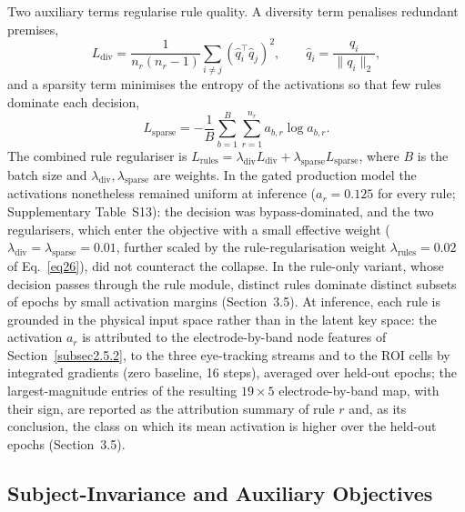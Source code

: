\documentclass[pdflatex,sn-basic,Numbered]{sn-jnl}
\begin{document}
Two auxiliary terms regularise rule quality. A diversity term penalises redundant premises,
\begin{equation}
L_{\mathrm{div}} = \frac{1}{n_r(n_r-1)} \sum_{i\neq j} \left(\hat q_i^\top \hat q_j\right)^2, \qquad \hat q_i = \frac{q_i}{\|q_i\|_2}, \label{eq19}
\end{equation}
and a sparsity term minimises the entropy of the activations so that few rules dominate each decision,
\begin{equation}
L_{\mathrm{sparse}} = -\frac{1}{B}\sum_{b=1}^{B}\sum_{r=1}^{n_r} a_{b,r}\log a_{b,r}. \label{eq20}
\end{equation}
The combined rule regulariser is $L_{\mathrm{rules}} = \lambda_{\mathrm{div}} L_{\mathrm{div}} + \lambda_{\mathrm{sparse}} L_{\mathrm{sparse}}$, where $B$ is the batch size and $\lambda_{\mathrm{div}}, \lambda_{\mathrm{sparse}}$ are weights. In the gated production model the activations nonetheless remained uniform at inference ($a_r=0.125$ for every rule; Supplementary Table~S13): the decision was bypass-dominated, and the two regularisers, which enter the objective with a small effective weight ($\lambda_{\mathrm{div}}=\lambda_{\mathrm{sparse}}=0.01$, further scaled by the rule-regularisation weight $\lambda_{\mathrm{rules}}=0.02$ of Eq.~\eqref{eq26}), did not counteract the collapse. In the rule-only variant, whose decision passes through the rule module, distinct rules dominate distinct subsets of epochs by small activation margins (Section~3.5). At inference, each rule is grounded in the physical input space rather than in the latent key space: the activation $a_r$ is attributed to the electrode-by-band node features of Section~\ref{subsec2.5.2}, to the three eye-tracking streams and to the ROI cells by integrated gradients \cite{ref54} (zero baseline, 16 steps), averaged over held-out epochs; the largest-magnitude entries of the resulting $19\times5$ electrode-by-band map, with their sign, are reported as the attribution summary of rule $r$ and, as its conclusion, the class on which its mean activation is higher over the held-out epochs (Section~3.5).

\subsection{Subject-Invariance and Auxiliary Objectives}\label{subsec2.5.9}
\end{document}
